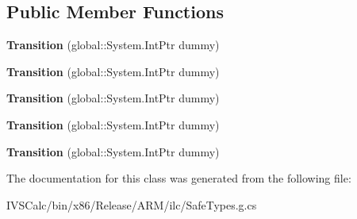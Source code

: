 \subsection*{Public Member Functions}
\begin{DoxyCompactItemize}
\item 
\mbox{\label{class_windows_1_1_u_i_1_1_xaml_1_1_media_1_1_animation_1_1_transition_a3b5332f6436406296acf48ce3360c8aa}} 
{\bfseries Transition} (global\+::\+System.\+Int\+Ptr dummy)
\item 
\mbox{\label{class_windows_1_1_u_i_1_1_xaml_1_1_media_1_1_animation_1_1_transition_a3b5332f6436406296acf48ce3360c8aa}} 
{\bfseries Transition} (global\+::\+System.\+Int\+Ptr dummy)
\item 
\mbox{\label{class_windows_1_1_u_i_1_1_xaml_1_1_media_1_1_animation_1_1_transition_a3b5332f6436406296acf48ce3360c8aa}} 
{\bfseries Transition} (global\+::\+System.\+Int\+Ptr dummy)
\item 
\mbox{\label{class_windows_1_1_u_i_1_1_xaml_1_1_media_1_1_animation_1_1_transition_a3b5332f6436406296acf48ce3360c8aa}} 
{\bfseries Transition} (global\+::\+System.\+Int\+Ptr dummy)
\item 
\mbox{\label{class_windows_1_1_u_i_1_1_xaml_1_1_media_1_1_animation_1_1_transition_a3b5332f6436406296acf48ce3360c8aa}} 
{\bfseries Transition} (global\+::\+System.\+Int\+Ptr dummy)
\end{DoxyCompactItemize}


The documentation for this class was generated from the following file\+:\begin{DoxyCompactItemize}
\item 
I\+V\+S\+Calc/bin/x86/\+Release/\+A\+R\+M/ilc/Safe\+Types.\+g.\+cs\end{DoxyCompactItemize}
